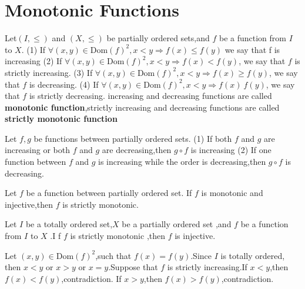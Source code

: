 \documentclass{book}
\numberwithin{equation}{section}
\begin{document}
\section{Monotonic Functions}
\begin{definitionenv}
    Let$(I,\le)$ and $(X,\le)$ be partially ordered sets,and $f$ be a function from $I$
 to $X$.
 \newline
 (1) If $\forall(x,y)\in \mathrm{Dom}(f)^2,x<y \Rightarrow f(x)\le f(y)$ we say that f is increasing 
 \newline
 (2) If $\forall (x,y)\in \mathrm{Dom}(f)^2,x<y \Rightarrow f(x)< f(y)$, we say that $f$ is strictly increasing.
 \newline
  (3) If $\forall (x,y)\in \mathrm{Dom}(f)^2,x<y \Rightarrow f(x)\geq  f(y)$, we say that $f$ is decreasing.
\newline
 (4) If $\forall (x,y)\in \mathrm{Dom}(f)^2,x<y \Rightarrow f(x)\> f(y)$, we say that $f$ is strictly decreasing.
 \newline
increasing and decreasing functions are called \textbf{monotonic function},strictly increasing and decreasing functions are called \textbf{strictly monotonic function}
\end{definitionenv}
\begin{propositionenv}
    Let $f,g$ be functions between partially ordered sets.
    \newline
    (1) If both $f$ and $g$ are increasing or both $f$ and $g$ are decreasing,then $g\circ f $ is increasing
    \newline
    (2) If one function between $f$ and $g$ is increasing while the order is decreasing,then $g\circ f $ is decreasing.
\end{propositionenv}
\begin{propositionenv}
    Let $f$ be a function between partially ordered set. If $f$ is monotonic and injective,then $f$ is strictly monotonic.
\end{propositionenv}
\begin{propositionenv}
    Let $I$ be a totally ordered set,$X$ be a partially ordered set ,and $f$ be a function from $I$ to $X$ .I f $f$ is strictly monotonic
    ,then $f$ is injective.
\end{propositionenv}
\begin{proofenv}
    Let $(x,y)\in \mathrm{Dom}(f)^2$,such that $f(x)=f(y)$.Since $I$ is totally ordered, then $x<y$ or $x>y$ or $x=y$.Suppose that $f$ is strictly increasing.If $x<y $,then $f(x)<f(y)$,contradiction. If $x>y $,then $f(x)>f(y)$,contradiction.
\end{proofenv}
\end{document}
